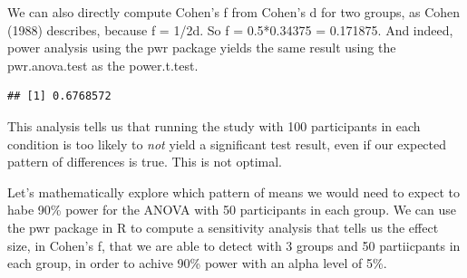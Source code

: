 \documentclass[]{article}
\newenvironment{Shaded}{\begin{snugshade}}{\end{snugshade}}
\newcommand{\KeywordTok}[1]{\textcolor[rgb]{0.13,0.29,0.53}{\textbf{#1}}}
\newcommand{\DataTypeTok}[1]{\textcolor[rgb]{0.13,0.29,0.53}{#1}}
\newcommand{\DecValTok}[1]{\textcolor[rgb]{0.00,0.00,0.81}{#1}}
\newcommand{\FloatTok}[1]{\textcolor[rgb]{0.00,0.00,0.81}{#1}}
\newcommand{\StringTok}[1]{\textcolor[rgb]{0.31,0.60,0.02}{#1}}
\newcommand{\CommentTok}[1]{\textcolor[rgb]{0.56,0.35,0.01}{\textit{#1}}}
\newcommand{\OperatorTok}[1]{\textcolor[rgb]{0.81,0.36,0.00}{\textbf{#1}}}
\newcommand{\NormalTok}[1]{#1}
\begin{document}
We can also directly compute Cohen's f from Cohen's d for two groups, as
Cohen (1988) describes, because f = 1/2d. So f = 0.5*0.34375 = 0.171875.
And indeed, power analysis using the pwr package yields the same result
using the pwr.anova.test as the power.t.test.

\begin{Shaded}
\end{Shaded}

\begin{verbatim}
## [1] 0.6768572
\end{verbatim}

This analysis tells us that running the study with 100 participants in
each condition is too likely to \emph{not} yield a significant test
result, even if our expected pattern of differences is true. This is not
optimal.

Let's mathematically explore which pattern of means we would need to
expect to habe 90\% power for the ANOVA with 50 participants in each
group. We can use the pwr package in R to compute a sensitivity analysis
that tells us the effect size, in Cohen's f, that we are able to detect
with 3 groups and 50 partiicpants in each group, in order to achive 90\%
power with an alpha level of 5\%.

\begin{Shaded}
\end{Shaded}
\end{document}
